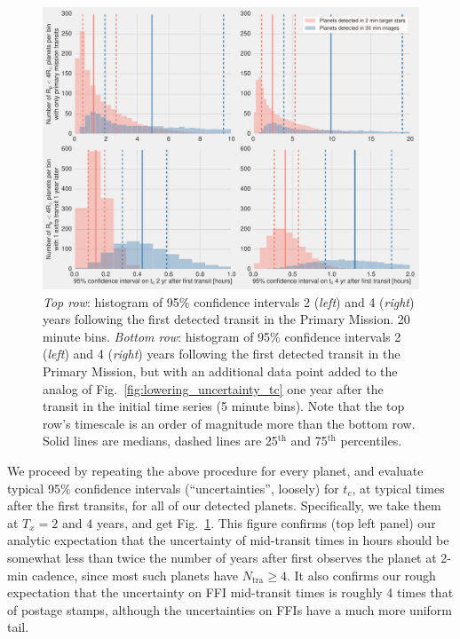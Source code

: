\begin{figure}[!t]
	\centering
	\includegraphics[scale=1.]{figures/confidence_interval_gets_better.pdf}
	\caption{\textit{Top row}: histogram of 95\% confidence intervals 2 (\textit{left}) and 4 (\textit{right}) years following the first detected transit in the Primary Mission.
		20 minute bins.
		\textit{Bottom row}: histogram of 95\% confidence intervals 2 (\textit{left}) and 4 (\textit{right}) years following the first detected transit in the Primary Mission, but with an additional data point added to the analog of Fig.~\protect\ref{fig:lowering_uncertainty_tc} one year after the transit in the initial time series (5 minute bins).
		Note that the top row's timescale is an order of magnitude more than the bottom row.
		Solid lines are medians, dashed lines are 25$^\mathrm{th}$ and 75$^\mathrm{th}$ percentiles.
	} %
	\label{fig:conf_interval_gets_better}
\end{figure}
We proceed by repeating the above procedure for every planet, and evaluate typical 95\% confidence intervals (``uncertainties'', loosely) for $t_c$, at typical times after the first transits, for all of our detected planets.
Specifically, we take them at $T_x=2$ and $4$ years, and get Fig.~\ref{fig:conf_interval_gets_better}.
This figure confirms (top left panel) our analytic expectation that the uncertainty of mid-transit times in hours should be somewhat less than twice the number of years after \tess first observes the planet at 2-min cadence, since most such planets have $N_\mathrm{tra}\geq4$.
It also confirms our rough expectation that the uncertainty on FFI mid-transit times is roughly 4 times that of postage stamps, although the uncertainties on FFIs have a much more uniform tail.

